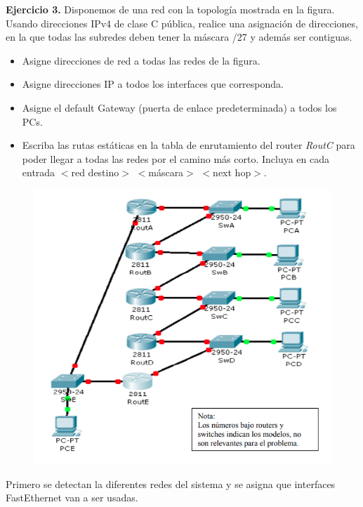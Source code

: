 \documentclass[12pt]{article}
\theoremstyle{definition}
\theoremstyle{remark}
\begin{document}
\textbf{Ejercicio 3.} Disponemos de una red con la topología mostrada en la figura. Usando direcciones IPv4 de clase C pública, realice una asignación de direcciones, en la que todas las subredes deben tener la máscara /27 y además ser contiguas.
\begin{itemize}
\item Asigne direcciones de red a todas las redes de la figura.
\item Asigne direcciones IP a todos los interfaces que corresponda.
\item Asigne el default Gateway (puerta de enlace predeterminada) a todos los PCs.
\item Escriba las rutas estáticas en la tabla de enrutamiento del router \textit{RoutC} para poder llegar a todas las redes por el camino más corto. Incluya en cada entrada $<$red destino$>$ $<$máscara$>$ $<$next hop$>$.
\end{itemize}

\begin{figure}[H]
   \center
  \includegraphics[scale=0.5]{img/3.png}
\end{figure}

\newpage

Primero se detectan la diferentes redes del sistema y se asigna que interfaces FastEthernet  van a ser usadas.
\end{document}
